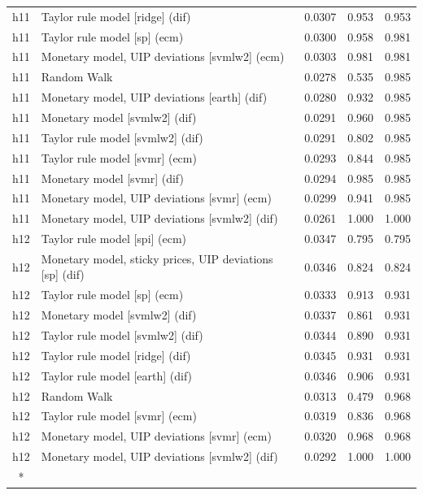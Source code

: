 \begin{ThreePartTable}
\begin{longtable}[t]{cp{5.5cm}ccc}
\addlinespace
h11 & \raggedright Taylor rule model [ridge] (dif) & 0.0307 & 0.953 & 0.953\\
h11 & \raggedright Taylor rule model [sp] (ecm) & 0.0300 & 0.958 & 0.981\\
h11 & \raggedright Monetary model, UIP deviations [svmlw2] (ecm) & 0.0303 & 0.981 & 0.981\\
h11 & \raggedright Random Walk & 0.0278 & 0.535 & 0.985\\
h11 & \raggedright Monetary model, UIP deviations [earth] (dif) & 0.0280 & 0.932 & 0.985\\
h11 & \raggedright Monetary model [svmlw2] (dif) & 0.0291 & 0.960 & 0.985\\
h11 & \raggedright Taylor rule model [svmlw2] (dif) & 0.0291 & 0.802 & 0.985\\
h11 & \raggedright Taylor rule model [svmr] (ecm) & 0.0293 & 0.844 & 0.985\\
h11 & \raggedright Monetary model [svmr] (dif) & 0.0294 & 0.985 & 0.985\\
h11 & \raggedright Monetary model, UIP deviations [svmr] (ecm) & 0.0299 & 0.941 & 0.985\\
h11 & \raggedright Monetary model, UIP deviations [svmlw2] (dif) & 0.0261 & 1.000 & 1.000\\
\addlinespace
h12 & \raggedright Taylor rule model [spi] (ecm) & 0.0347 & 0.795 & 0.795\\
h12 & \raggedright Monetary model, sticky prices, UIP deviations [sp] (dif) & 0.0346 & 0.824 & 0.824\\
h12 & \raggedright Taylor rule model [sp] (ecm) & 0.0333 & 0.913 & 0.931\\
h12 & \raggedright Monetary model [svmlw2] (dif) & 0.0337 & 0.861 & 0.931\\
h12 & \raggedright Taylor rule model [svmlw2] (dif) & 0.0344 & 0.890 & 0.931\\
h12 & \raggedright Taylor rule model [ridge] (dif) & 0.0345 & 0.931 & 0.931\\
h12 & \raggedright Taylor rule model [earth] (dif) & 0.0346 & 0.906 & 0.931\\
h12 & \raggedright Random Walk & 0.0313 & 0.479 & 0.968\\
h12 & \raggedright Taylor rule model [svmr] (ecm) & 0.0319 & 0.836 & 0.968\\
h12 & \raggedright Monetary model, UIP deviations [svmr] (ecm) & 0.0320 & 0.968 & 0.968\\
h12 & \raggedright Monetary model, UIP deviations [svmlw2] (dif) & 0.0292 & 1.000 & 1.000\\*
\end{longtable}
\end{ThreePartTable}
\endgroup{}
